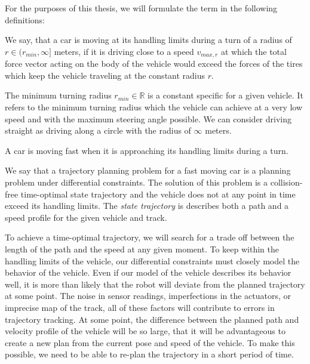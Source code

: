For the purposes of this thesis, we will formulate the term in the following definitions:

\begin{defn}
	We say, that a car is moving at its handling limits during a turn of a radius of $r\in(r_{min}, \infty]$ meters, if it is driving close to a speed $v_{max,r}$ at which the total force vector acting on the body of the vehicle would exceed the forces of the tires which keep the vehicle traveling at the constant radius $r$.
\end{defn}

The minimum turning radius $r_{min}\in\mathbb{R}$ is a constant specific for a given vehicle. It refers to the minimum turning radius which the vehicle can achieve at a very low speed and with the maximum steering angle possible. We can consider driving straight as driving along a circle with the radius of $\infty$ meters.

\begin{defn}\label{def:fast_moving_car}
	A car is moving fast when it is approaching its handling limits during a turn.
\end{defn}

\begin{defn}
	We say that a trajectory planning problem for a fast moving car is a planning problem under differential constraints. The solution of this problem is a collision-free time-optimal state trajectory and the vehicle does not at any point in time exceed its handling limits. The \textit{state trajectory} is describes both a path and a speed profile for the given vehicle and track.
\end{defn}


To achieve a time-optimal trajectory, we will search for a trade off between the length of the path and the speed at any given moment. To keep within the handling limits of the vehicle, our differential constraints must closely model the behavior of the vehicle. Even if our model of the vehicle describes its behavior well, it is more than likely that the robot will deviate from the planned trajectory at some point. The noise in sensor readings, imperfections in the actuators, or imprecise map of the track, all of these factors will contribute to errors in trajectory tracking. At some point, the difference between the planned path and velocity profile of the vehicle will be so large, that it will be advantageous to create a new plan from the current pose and speed of the vehicle. To make this possible, we need to be able to re-plan the trajectory in a short period of time.

